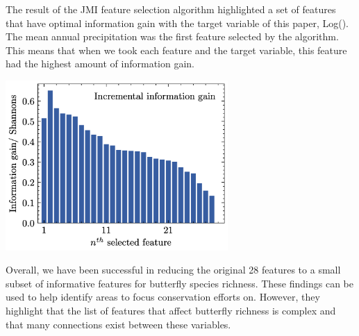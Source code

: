 \documentclass[prl,showpacs,superscriptaddress,twocolumn,longbibliography]{revtex4-1}
\begin{document}
The result of the JMI feature selection algorithm highlighted a set of features that have optimal information gain with the target variable of this paper, Log(). The mean annual precipitation was the first feature selected by the algorithm. This means that when we took each feature and the target variable, this feature had the highest amount of information gain. 
\begin{center}\includegraphics[width=240pt]{Features.png}\end{center}




Overall, we have been successful in reducing the original 28 features to a small subset of informative features for butterfly species richness. These findings can be used to help identify areas to focus conservation efforts on. However, they highlight that the list of features that affect butterfly richness is complex and that many connections exist between these variables.





\appendix
\end{document}
